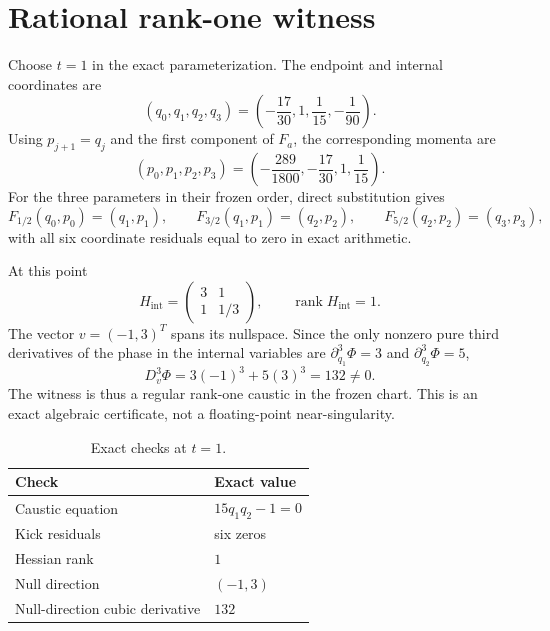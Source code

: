 \section{Rational rank-one witness}

Choose \(t=1\) in the exact parameterization.  The endpoint and internal
coordinates are
\[
 (q_0,q_1,q_2,q_3)=\left(-\frac{17}{30},1,\frac1{15},-\frac1{90}\right).
\]
Using \(p_{j+1}=q_j\) and the first component of \(F_a\), the corresponding
momenta are
\[
 (p_0,p_1,p_2,p_3)=\left(-\frac{289}{1800},-\frac{17}{30},1,\frac1{15}\right).
\]
For the three parameters in their frozen order, direct substitution gives
\[
 F_{1/2}(q_0,p_0)=(q_1,p_1),\qquad
 F_{3/2}(q_1,p_1)=(q_2,p_2),\qquad
 F_{5/2}(q_2,p_2)=(q_3,p_3),
\]
with all six coordinate residuals equal to zero in exact arithmetic.

At this point
\[
 H_{\mathrm{int}}=\begin{pmatrix}3&1\\1&1/3\end{pmatrix},
 \qquad \operatorname{rank} H_{\mathrm{int}}=1.
\]
The vector \(v=(-1,3)^T\) spans its nullspace.  Since the only nonzero pure
third derivatives of the phase in the internal variables are
\(\partial_{q_1}^3\Phi=3\) and \(\partial_{q_2}^3\Phi=5\),
\[
 D_v^3\Phi=3(-1)^3+5(3)^3=132\ne0.
\]
The witness is thus a regular rank-one caustic in the frozen chart.  This is
an exact algebraic certificate, not a floating-point near-singularity.

\begin{table}[ht]
\centering
\caption{Exact checks at \(t=1\).}
\label{tab:witness}
\begin{tabular}{ll}
\toprule
Check & Exact value \\
\midrule
Caustic equation & \(15q_1q_2-1=0\) \\
Kick residuals & six zeros \\
Hessian rank & \(1\) \\
Null direction & \((-1,3)\) \\
Null-direction cubic derivative & \(132\) \\
\bottomrule
\end{tabular}
\end{table}
